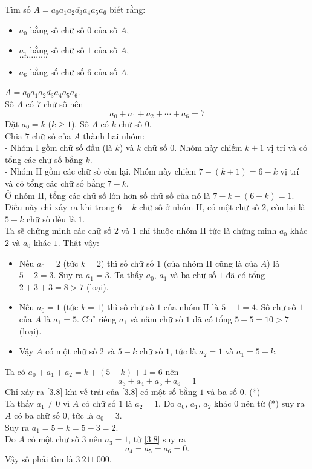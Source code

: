 \begin{bt}
 Tìm số $A = \overline{a_0 a_1 a_2 a_3 a_4 a_5 a_6}$ biết rằng:
 \begin{itemize}
  \item[ ] $a_0$ bằng số chữ số $0$ của số $A$,
  \item[ ] $a_1$ bằng số chữ số $1$ của số $A$,\\
  $\ldots \ldots \ldots \ldots$
  \item[ ] $a_6$ bằng số chữ số $6$ của số $A$.
 \end{itemize}
 \loigiai
  {
  $A = \overline{a_0 a_1 a_2 a_3 a_4 a_5 a_6}$.\\
  Số $A$ có $7$ chữ số nên
  \begin{equation}
   a_0 + a_1 + a_2 + \cdots + a_6 = 7 \label{3.7}
  \end{equation}
  Đặt $a_0 = k$ ($k \geq 1$). Số $A$ có $k$ chữ số $0$.\\
  Chia $7$ chữ số của $A$ thành hai nhóm:\\
  - Nhóm I gồm chữ số đầu (là $k$) và $k$ chữ số $0$. Nhóm này chiếm $k + 1$ vị trí và có tổng các chữ số bằng $k$.\\
  - Nhóm II gồm các chữ số còn lại. Nhóm này chiếm $7 - (k+1) = 6 - k$ vị trí và có tổng các chữ số bằng $7 - k$.\\
  Ở nhóm II, tổng các chữ số lớn hơn số chữ số của nó là $7 - k - (6 - k) = 1$. Điều này chỉ xảy ra khi  trong $6 - k$ chữ số ở nhóm II, có một chữ số $2$, còn lại là $5 - k$ chữ số đều là $1$.\\
  Ta sẽ chứng minh các chữ số $2$ và $1$ chỉ thuộc nhóm II tức là chứng minh $a_0$ khác $2$ và $a_0$ khác $1$. Thật vậy:
  \begin{itemize}
   \item Nếu $a_0 = 2$ (tức $k = 2$) thì số chữ số $1$ (của nhóm II cũng là của $A$) là $5 - 2 = 3$. Suy ra $a_1 = 3$. Ta thấy $a_0$, $a_1$ và ba chữ số $1$ đã có tổng $2 + 3 + 3 = 8 > 7$ (loại).
   \item Nếu $a_0 = 1$ (tức $k = 1$) thì số chữ số $1$ của nhóm II là $5 - 1 = 4$. Số chữ số $1$ của $A$ là $a_1 = 5$. Chỉ riêng $a_1$ và năm chữ số $1$ đã có tổng $5 + 5 = 10 > 7$ (loại).
   \item Vậy $A$ có một chữ số $2$ và $5-k$ chữ số $1$, tức là $a_2 = 1$ và $a_1 = 5 - k$.
  \end{itemize}
  Ta có $a_0 + a_1 + a_2 = k + (5 - k) + 1 = 6$ nên
  \begin{equation}
   a_3 + a_4 + a_5 + a_6 = 1 \label{3.8}
  \end{equation}
  Chỉ xảy ra \eqref{3.8} khi vế trái của \eqref{3.8} có một số bằng $1$ và ba số $0$. \hfill (*)\\
  Ta thấy $a_1 \neq 0$ vì $A$ có chữ số $1$ là $a_2 = 1$. Do $a_0$, $a_1$, $a_2$ khác $0$  nên từ (*) suy ra $A$ có ba chữ số $0$, tức là $a_0 = 3$.\\
  Suy ra $a_1 = 5 - k = 5 - 3 = 2$.\\
  Do $A$ có một chữ số $3$ nên $a_3 = 1$, từ \eqref{3.8} suy ra
  $$a_4 = a_5 = a_6 = 0.$$
  Vậy số phải tìm là $3 \ 211 \ 000$.
  }
\end{bt}